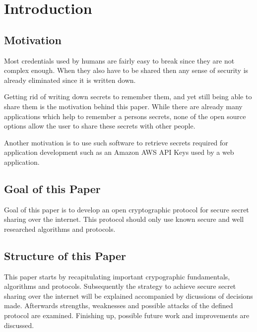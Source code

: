 \chapter{Introduction}
\label{cha:Introduction}

\section{Motivation}
\label{sec:Motivation}

Most credentials used by humans are fairly easy to break since they are not
complex enough. When they also have to be shared then any sense of security is
already eliminated since it is written down.

Getting rid of writing down secrets to remember them, and yet still being able
to share them is the motivation behind this paper. While there are already many
applications which help to remember a persons secrets, none of the open source
options allow the user to share these secrets with other people.

Another motivation is to use such software to retrieve secrets required for
application development such as an Amazon AWS API Keys used by a web
application.

\section{Goal of this Paper}
\label{sec:GoalOfThisPaper}

Goal of this paper is to develop an open cryptographic protocol for secure
secret sharing over the internet. This protocol should only use known secure
and well researched algorithms and protocols.

\section{Structure of this Paper}
\label{sec:StructureOfThisPaper}

This paper starts by recapitulating important crypographic fundamentals,
algorithms and protocols. Subsequently the strategy to achieve secure secret
sharing over the internet will be explained accompanied by dicussions of
decisions made. Afterwards strengths, weaknesses and possible attacks of the
defined protocol are examined. Finishing up, possible future work and
improvements are discussed.
